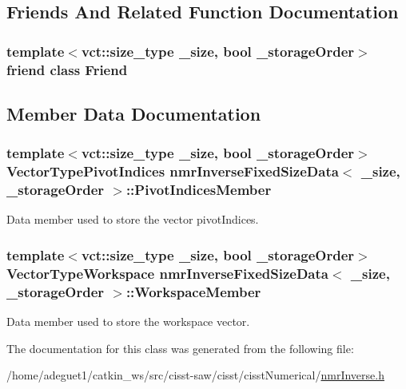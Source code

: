 \subsection{Friends And Related Function Documentation}
\hypertarget{classnmr_inverse_fixed_size_data_a7f8321d57e81bc613d5dbef3410ba70e}{
\subsubsection[{Friend}]{\setlength{\rightskip}{0pt plus 5cm}template$<$vct\-::size\-\_\-type \-\_\-size, bool \-\_\-storage\-Order$>$ friend class {\bf Friend}\hspace{0.3cm}{\ttfamily [friend]}}}\label{classnmr_inverse_fixed_size_data_a7f8321d57e81bc613d5dbef3410ba70e}


\subsection{Member Data Documentation}
\hypertarget{classnmr_inverse_fixed_size_data_aab37fa3e8096dc8ec9ac1b9098c34769}{
\subsubsection[{Pivot\-Indices\-Member}]{\setlength{\rightskip}{0pt plus 5cm}template$<$vct\-::size\-\_\-type \-\_\-size, bool \-\_\-storage\-Order$>$ {\bf Vector\-Type\-Pivot\-Indices} {\bf nmr\-Inverse\-Fixed\-Size\-Data}$<$ \-\_\-size, \-\_\-storage\-Order $>$\-::Pivot\-Indices\-Member\hspace{0.3cm}{\ttfamily [protected]}}}\label{classnmr_inverse_fixed_size_data_aab37fa3e8096dc8ec9ac1b9098c34769}
Data member used to store the vector pivot\-Indices. \hypertarget{classnmr_inverse_fixed_size_data_a701268b213e63dd44ad0a9869fc20e15}{
\subsubsection[{Workspace\-Member}]{\setlength{\rightskip}{0pt plus 5cm}template$<$vct\-::size\-\_\-type \-\_\-size, bool \-\_\-storage\-Order$>$ {\bf Vector\-Type\-Workspace} {\bf nmr\-Inverse\-Fixed\-Size\-Data}$<$ \-\_\-size, \-\_\-storage\-Order $>$\-::Workspace\-Member\hspace{0.3cm}{\ttfamily [protected]}}}\label{classnmr_inverse_fixed_size_data_a701268b213e63dd44ad0a9869fc20e15}
Data member used to store the workspace vector. 

The documentation for this class was generated from the following file\-:\begin{DoxyCompactItemize}
\item 
/home/adeguet1/catkin\-\_\-ws/src/cisst-\/saw/cisst/cisst\-Numerical/\hyperlink{nmr_inverse_8h}{nmr\-Inverse.\-h}\end{DoxyCompactItemize}
